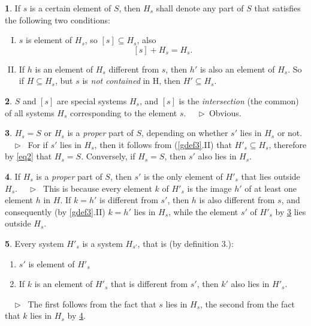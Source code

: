 \documentclass[leqno,hidelinks]{article}
\theoremstyle{definition}
\newtheorem{satz}{\protect\satzname}
\newtheorem{deff}[satz]{\protect\deffname}
\newcommand{\satzname}{}
\newcommand{\deffname}{}
\renewcommand{\satzname}{\hspace{-4pt}.\ Satz}%
\renewcommand{\deffname}{\hspace{-4pt}.\ Definition}%
\renewcommand{\satzname}{\hspace{-4pt}.\ Theorem}%
\renewcommand{\deffname}{\hspace{-4pt}.\ Definition}%
\newcommand\Beweis{\medskip \newline $ \phantom{'.'} \rhd \ $}%
\newcommand\beweis{ $ \phantom{'.'} \rhd \ $}%
\newcommand{\partof}{\subseteq}
\newcommand{\sref}[1]{\underline{\ref{#1}}}%
\begin{document}
\begin{paracol}{2}
\newpage

\begin{deff}\label{def3}
If $s$ is a certain element of $S$, then $H_s$ shall denote any part of $S$ that
satisfies the following two conditions:
\vspace{8pt} %

\begin{enumerate}[I.]
\item $s$ is element of $H_s$, so $[s] \partof H_s$, also
\[
	[s] + H_s = H_s.
\]
\item If $h$ is an element of $H_s$ different from $s$, then $h'$ is also an
element of $H_s$. So if $H \partof H_s$, but $s$ is \emph{not contained} in H,
then $H' \partof H_s$.
\end{enumerate}
\end{deff}

\begin{satz}\label{thm4}
$S$ and $[s]$ are special systems $H_s$, and $[s]$ is the \emph{intersection}
(the common) of all systems $H_s$ corresponding to the element $s$.
\Beweis Obvious. \end{satz}

\begin{satz}\label{thm5}
$H_s = S$ or $H_s$ is a \textit{proper} part of $S$, depending on whether
$s'$ lies in $H_s$ or not.
\Beweis
For if $s'$ lies in $H_s$, then it follows from (\sref{gdef3}{\color{ultrav}.II)}
that $H'_s \partof H_s$, therefore by \eqref{eq2} that $H_s = S$. Conversely,
if $H_s = S$, then $s'$ also lies in $H_s$.
\end{satz}

\begin{satz}\label{thm6}
If $H_s$ is a \emph{proper} part of $S$, then $s'$ is the only element of
$H'_s$ that lies outside $H_s$.
\Beweis
This is because every element $k$ of $H'_s$ is the image $h'$ of at least one
element $h$ in $H$. If $k=h'$ is different from $s'$, then $h$ is also different
from $s$, and consequently (by \sref{gdef3}{\color{ultrav}.II)} $k = h'$ lies in
$H_s$, while the element $s'$ of $H'_s$ by \sref{thm5} lies outside $H_s$.
\end{satz}

\begin{satz}\label{thm7}
Every system $H'_s$ is a system $H_{s'}$, that is (by definition 3.):
\begin{enumerate}[I'.]
	\item $s'$ is element of $H'_s$
	\item If $k$ is an element of $H'_s$ that is different from $s'$, then $k'$
    also lies in $H'_s$.
\end{enumerate}
\beweis
The first follows from the fact that $s$ lies in $H_s$, the second from the fact
that $k$ lies in $H_s$ by \sref{thm6}.
\end{satz}


\end{paracol}
\end{document}
